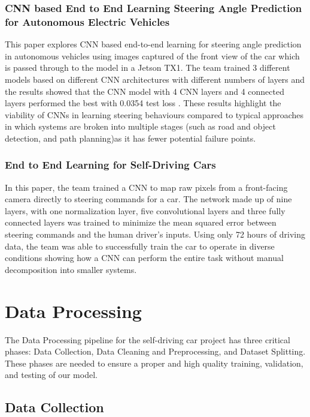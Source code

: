 \documentclass{article} %
\begin{document}
\subsubsection{CNN based End to End Learning Steering Angle Prediction for Autonomous Electric Vehicles \citep{Mygapula2021}}

This paper explores CNN based end-to-end learning for steering angle prediction in autonomous vehicles using images captured of the front 
view of the car which is passed through to the model in a Jetson TX1. The team trained 3 different models based on different CNN architectures 
with different numbers of layers and the results showed that the CNN model with 4 CNN layers and 4 connected layers performed the 
best with 0.0354 test loss \citep{Mygapula2021}. These results highlight the viability of CNNs in learning steering behaviours compared to typical 
approaches in which systems are broken into multiple stages (such as road and object detection, and path planning)as it has fewer potential failure points.

\subsubsection{End to End Learning for Self-Driving Cars \citep{bojarski2016endendlearningselfdriving}}

In this paper, the team trained a CNN to map raw pixels from a front-facing camera directly to steering commands for a car. 
The network made up of nine layers, with one normalization layer, five convolutional layers and three fully connected layers 
was trained to minimize the mean squared error between steering commands and the human driver’s inputs. Using only 
72 hours of driving data, the team was able to successfully train the car to operate in diverse conditions showing 
how a CNN can perform the entire task without manual decomposition into smaller systems. 

\section{Data Processing}
\label{headings}


The Data Processing pipeline for the self-driving car project has three critical phases:
Data Collection, Data Cleaning and Preprocessing, and Dataset Splitting. These phases are
needed to ensure a proper and high quality training, validation, and testing of our model.

\subsection{Data Collection}
\end{document}
